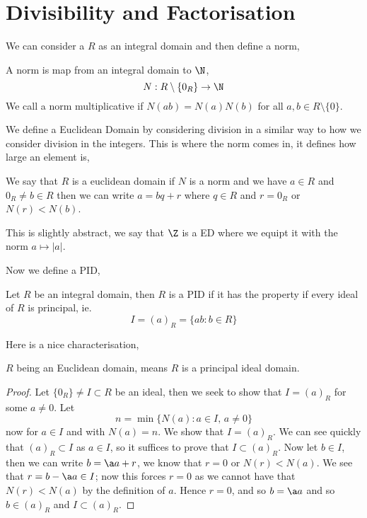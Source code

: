 
\section{Divisibility and Factorisation}

We can consider a $R$ as an integral domain and then define a norm,
\begin{ndefi}[Norm]
  A norm is map from an integral domain to $\N$,
  $$ N : R\setminus \{0_R\} \to \N $$
  We call a norm multiplicative if $N(ab) = N(a)N(b)$ for all $a, b \in R\setminus \{0\}$.
\end{ndefi}

\noindent
We define a Euclidean Domain by considering division in a similar way to how we consider division in the integers. This is where the norm comes in, it defines how large an element is,
\begin{ndefi}
  We say that $R$ is a euclidean domain if $N$ is a norm and we have $a \in R$ and $0_R \ne b \in R$ then we can write $a = bq + r$ where $q \in R$ and $r = 0_R$ or $N(r) < N(b)$.
\end{ndefi}

This is slightly abstract, we say that $\Z$ is a ED where we equipt it with the norm $a \mapsto |a|$.

\noindent
Now we define a PID,
\begin{ndefi}
  Let $R$ be an integral domain, then $R$ is a PID if it has the property if every ideal of $R$ is principal, ie.
  $$ I = (a)_R = \{ab : b \in R\} $$
\end{ndefi}
Here is a nice characterisation,

\begin{nthm}
  $R$ being an Euclidean domain, means $R$ is a principal ideal domain.
\end{nthm}
\begin{proof}
  Let $\{0_R\} \ne I \subset R$ be an ideal, then we seek to show that $I = (a)_R$ for some $a \ne 0$. Let
  $$ n = \min\{N(a) : a \in I,\, a \ne 0\} $$
  now for $a \in I$ and with $N(a) = n$. We show that $I = (a)_R$. We can see quickly that $(a)_R \subset I$ as $a \in I$, so it suffices to prove that $I \subset (a)_R$. Now let $b \in I$, then we can write $b = \a a + r$, we know that $r = 0$ or $N(r) < N(a)$. We see that $r = b - \a a \in I$; now this forces $r = 0$ as we cannot have that $N(r) < N(a)$ by the definition of $a$. Hence $r = 0$, and so $b = \a a$ and so $b \in (a)_R$ and $I \subset (a)_R$.
\end{proof}